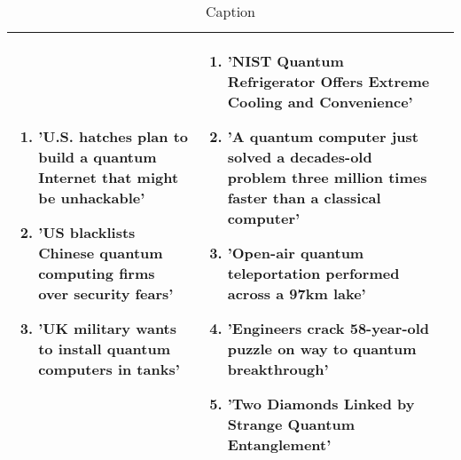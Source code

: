 \begin{table}
\begin{adjustbox}{center}
\begin{tabular}{p{0.5cm} p{8cm} p{8cm}}
{\begin{enumerate}
        \item 'U.S. hatches plan to build a quantum Internet that might be unhackable'
        \item 'US blacklists Chinese quantum computing firms over security fears'
        \item 'UK military wants to install quantum computers in tanks' 
 \end{enumerate}}
    & \multicolumn{1}{p{8cm}}{\footnotesize \centering \begin{enumerate}
        \item 'NIST Quantum Refrigerator Offers Extreme Cooling and Convenience'
        \item 'A quantum computer just solved a decades-old problem three million times faster than a classical computer'
        \item 'Open-air quantum teleportation performed across a 97km lake'
        \item 'Engineers crack 58-year-old puzzle on way to quantum breakthrough'
        \item 'Two Diamonds Linked by Strange Quantum Entanglement' 
        \end{enumerate}}
    \\
    \bottomrule
\end{tabular}
    \end{adjustbox}
    \vspace{1em}
    \caption{Caption}

 \label{tab:top_score_headlines}
\end{table}


